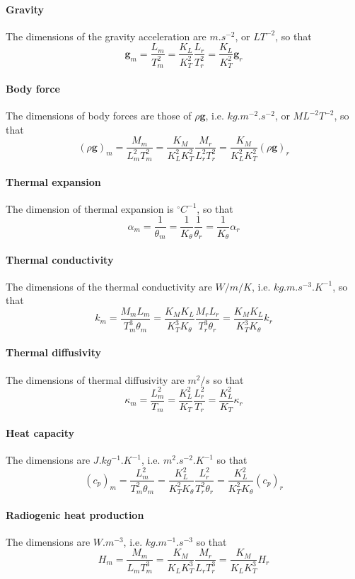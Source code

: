 \paragraph{Gravity} The dimensions of the gravity acceleration are $m.s^{-2}$, or $LT^{-2}$, so that
\[
{\bm g}_m=\frac{L_m}{T_m^2}=\frac{K_L}{K_T^2}\frac{L_r}{T_r^2}=\frac{K_L}{K_T^2} {\bm g}_r
\]



\paragraph{Body force} The dimensions of body forces are those of $\rho {\bm g}$, i.e. $kg.m^{-2}.s^{-2}$, or $ML^{-2}T^{-2}$, so that
\[
(\rho {\bm g})_m = \frac{M_m}{L_m^2T_m^2}=\frac{K_M}{K_L^2K_T^2}\frac{M_r}{L_r^2T_r^2}=\frac{K_M}{K_L^2K_T^2}(\rho {\bm g})_r
\]
\paragraph{Thermal expansion}  The dimension of thermal expansion is $^\circ C^{-1}$, so that
\[
\alpha_m = \frac{1}{\theta_m} = \frac{1}{K_\theta} \frac{1}{\theta_r} = \frac{1}{K_\theta} \alpha_r
\]
\paragraph{Thermal conductivity} The dimensions of the thermal conductivity are $W/m/K$, i.e. $kg.m.s^{-3}.K^{-1}$, so that
\[
k_m = \frac{M_m L_m}{T^3_m \theta_m} = \frac{K_M K_L}{K_T^3 K_\theta}\frac{M_r L_r}{T^3_r \theta_r} = \frac{K_M K_L}{K_T^3 K_\theta}k_r
\]

\paragraph{Thermal diffusivity} The dimensions of thermal diffusivity are $m^2/s$ so that
\[
\kappa_m = \frac{L^2_m}{T_m} = \frac{K_L^2}{K_T} \frac{L_r^2}{T_r} = \frac{K_L^2}{K_T} \kappa_r 
\]

\paragraph{Heat capacity} The dimensions are $J.kg^{-1}.K^{-1}$, i.e. $m^2.s^{-2}.K^{-1}$ so that
\[
(c_p)_m = \frac{L^2_m}{T_m^2 \theta_m} = \frac{K_L^2}{K_T^2 K_\theta} \frac{L^2_r}{T_r^2 \theta_r} = \frac{K_L^2}{K_T^2 K_\theta} (c_p)_r 
\]

\paragraph{Radiogenic heat production} The dimensions are $W.m^{-3}$, i.e. $kg.m^{-1}.s^{-3}$ so that
\[
H_m = \frac{M_m}{L_m T_m^3} = \frac{K_M}{K_L K_T^3} \frac{M_r }{L_r T_r^3} = \frac{K_M}{K_L K_T^3} H_r 
\]

